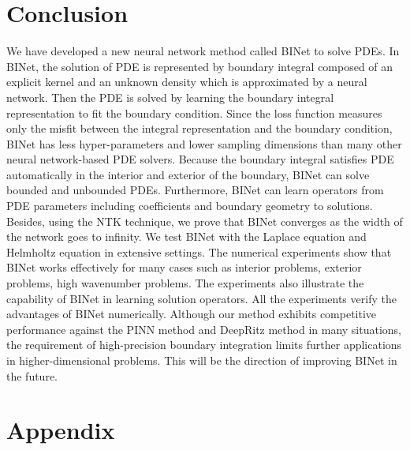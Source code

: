 \documentclass[hyperref]{article}
\numberwithin{equation}{section}
\theoremstyle{nonumberplain}
\begin{document}
	\section{Conclusion}
	\label{sec:con}
	We have developed a new neural network method called BINet to solve PDEs. In BINet, the solution of PDE is represented by boundary integral composed of an explicit kernel and an unknown density which is approximated by a neural network. Then the PDE is solved by learning the boundary integral representation to fit the boundary condition. Since the loss function measures only the misfit between the integral representation and the boundary condition, BINet has less hyper-parameters and lower sampling dimensions than many other neural network-based PDE solvers. Because the boundary integral satisfies PDE automatically in the interior and exterior of the boundary,  BINet can solve bounded and unbounded PDEs. Furthermore, BINet can learn operators from PDE parameters including coefficients and boundary geometry to solutions. Besides, using the NTK technique, we prove that BINet converges as the width of the network goes to infinity.  We test BINet with the Laplace equation and Helmholtz equation in extensive settings. The numerical experiments show that BINet works effectively for many cases such as interior problems, exterior problems, high wavenumber problems. The experiments also illustrate the capability of BINet in learning solution operators. All the experiments verify the advantages of BINet numerically.  Although our method exhibits competitive performance against the PINN method and DeepRitz method in many situations, the requirement of high-precision boundary integration limits further applications in higher-dimensional problems. This will be the direction of improving BINet in the future.
	
	
	
	
	
	
	
	
	
	
	 
	
	
	\newpage
	
	
	\appendix
	\section*{Appendix}
\end{document}
